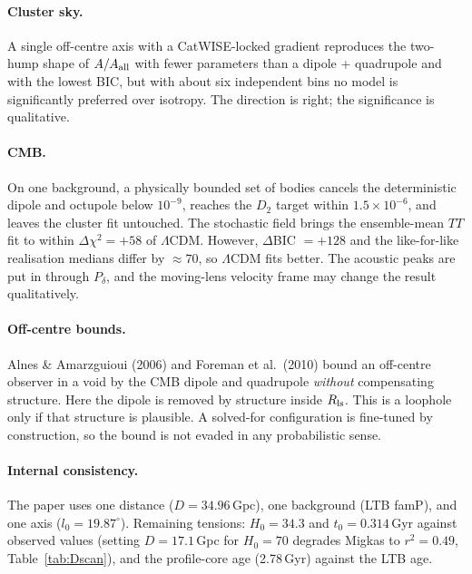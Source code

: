 \documentclass[11pt]{article}
\begin{document}
\paragraph{Cluster sky.} A single off-centre axis with a CatWISE-locked gradient reproduces the two-hump shape of $A/A_{\rm all}$ with fewer parameters than a dipole + quadrupole and with the lowest BIC, but with about six independent bins no model is significantly preferred over isotropy. The direction is right; the significance is qualitative.

\paragraph{CMB.} On one background, a physically bounded set of bodies cancels the deterministic dipole and octupole below $10^{-9}$, reaches the $D_2$ target within $1.5\times10^{-6}$, and leaves the cluster fit untouched. The stochastic field brings the ensemble-mean $TT$ fit to within $\Delta\chi^2=+58$ of $\Lambda$CDM. However, $\Delta$BIC $=+128$ and the like-for-like realisation medians differ by $\approx70$, so $\Lambda$CDM fits better. The acoustic peaks are put in through $P_\delta$, and the moving-lens velocity frame may change the result qualitatively.

\paragraph{Off-centre bounds.} Alnes \& Amarzguioui (2006) and Foreman et al.\ (2010) bound an off-centre observer in a void by the CMB dipole and quadrupole \emph{without} compensating structure. Here the dipole is removed by structure inside $R_{\rm ls}$. This is a loophole only if that structure is plausible. A solved-for configuration is fine-tuned by construction, so the bound is not evaded in any probabilistic sense.

\paragraph{Internal consistency.} The paper uses one distance ($D=34.96$\,Gpc), one background (LTB famP), and one axis ($l_0=19.87^\circ$). Remaining tensions: $H_0=34.3$ and $t_0=0.314$\,Gyr against observed values (setting $D=17.1$\,Gpc for $H_0=70$ degrades Migkas to $r^2=0.49$, Table~\ref{tab:Dscan}), and the profile-core age (2.78\,Gyr) against the LTB age.
\end{document}
